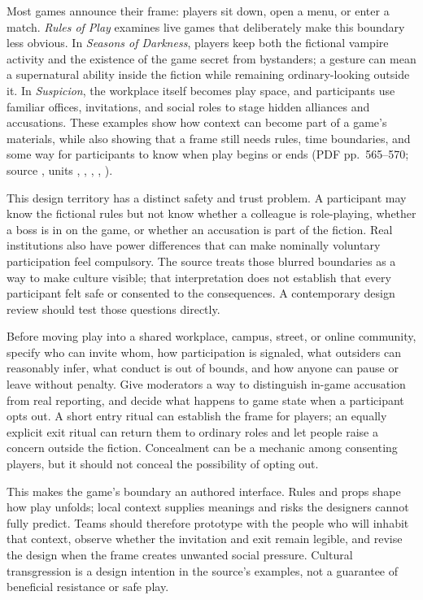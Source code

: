 Most games announce their frame: players sit down, open a menu, or enter a match. \emph{Rules of Play} examines live games that deliberately make this boundary less obvious. In \emph{Seasons of Darkness}, players keep both the fictional vampire activity and the existence of the game secret from bystanders; a gesture can mean a supernatural ability inside the fiction while remaining ordinary-looking outside it. In \emph{Suspicion}, the workplace itself becomes play space, and participants use familiar offices, invitations, and social roles to stage hidden alliances and accusations. These examples show how context can become part of a game's materials, while also showing that a frame still needs rules, time boundaries, and some way for participants to know when play begins or ends (PDF pp.~565--570; source , units , , , , ).

This design territory has a distinct safety and trust problem. A participant may know the fictional rules but not know whether a colleague is role-playing, whether a boss is in on the game, or whether an accusation is part of the fiction. Real institutions also have power differences that can make nominally voluntary participation feel compulsory. The source treats those blurred boundaries as a way to make culture visible; that interpretation does not establish that every participant felt safe or consented to the consequences. A contemporary design review should test those questions directly.

Before moving play into a shared workplace, campus, street, or online community, specify who can invite whom, how participation is signaled, what outsiders can reasonably infer, what conduct is out of bounds, and how anyone can pause or leave without penalty. Give moderators a way to distinguish in-game accusation from real reporting, and decide what happens to game state when a participant opts out. A short entry ritual can establish the frame for players; an equally explicit exit ritual can return them to ordinary roles and let people raise a concern outside the fiction. Concealment can be a mechanic among consenting players, but it should not conceal the possibility of opting out.

This makes the game's boundary an authored interface. Rules and props shape how play unfolds; local context supplies meanings and risks the designers cannot fully predict. Teams should therefore prototype with the people who will inhabit that context, observe whether the invitation and exit remain legible, and revise the design when the frame creates unwanted social pressure. Cultural transgression is a design intention in the source's examples, not a guarantee of beneficial resistance or safe play.

